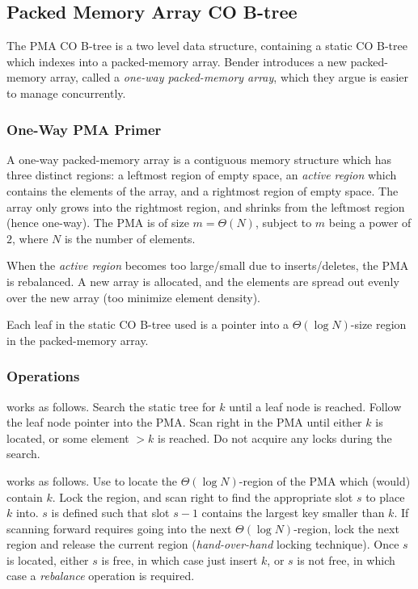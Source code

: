 \documentclass{style}
\begin{document}
\subsection{Packed Memory Array CO B-tree}
\label{sec:pma}

The PMA CO B-tree is a two level data structure, containing a static CO B-tree
which indexes into a packed-memory array. Bender introduces a new
packed-memory array, called a \textit{one-way packed-memory array}, which they
argue is easier to manage concurrently.

\subsubsection{One-Way PMA Primer}

A one-way packed-memory array is a contiguous memory structure which has three
distinct regions: a leftmost region of empty space, an \textit{active region}
which contains the elements of the array, and a rightmost region of empty
space. The array only grows into the rightmost region, and shrinks from the
leftmost region (hence one-way). The PMA is of size $m = \Theta(N)$, subject
to $m$ being a power of $2$, where $N$ is the number of elements.

When the \textit{active region} becomes too large/small due to
inserts/deletes, the PMA is rebalanced. A new array is allocated, and the
elements are spread out evenly over the new array (too minimize element
density).

Each leaf in the static CO B-tree used is a pointer into a $\Theta(\log
N)$-size region in the packed-memory array.

\subsubsection{Operations}

\Search{} works as follows. Search the static tree for $k$ until a leaf node
is reached. Follow the leaf node pointer into the PMA. Scan right in the PMA
until either $k$ is located, or some element $> k$ is reached. Do not acquire
any locks during the search.

\Insert{} works as follows. Use \Search{} to locate the $\Theta(\log
N)$-region of the PMA which (would) contain $k$. Lock the region, and scan
right to find the appropriate slot $s$ to place $k$ into. $s$ is defined such
that slot $s - 1$ contains the largest key smaller than $k$. If scanning
forward requires going into the next $\Theta(\log N)$-region, lock the next
region and release the current region (\textit{hand-over-hand} locking
technique). Once $s$ is located, either $s$ is free, in which case just insert
$k$, or $s$ is not free, in which case a \textit{rebalance} operation is
required.
\end{document}
